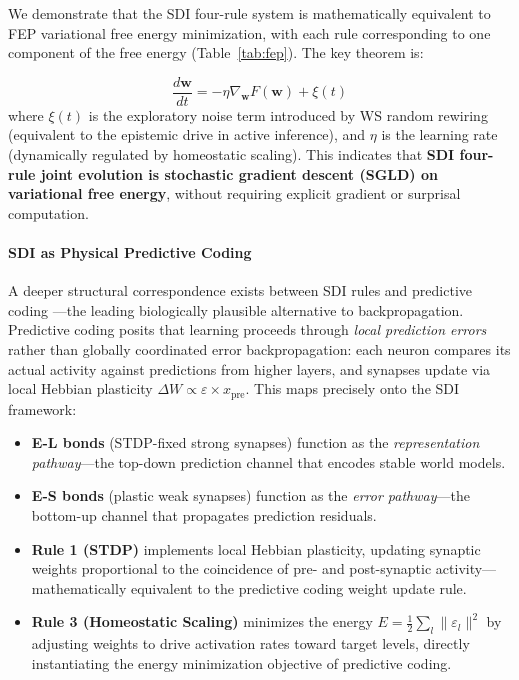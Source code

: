 \documentclass[12pt,a4paper]{article}
\begin{document}
We demonstrate that the SDI four-rule system is mathematically equivalent to FEP variational free energy minimization, with each rule corresponding to one component of the free energy (Table~\ref{tab:fep}). The key theorem is:

\begin{equation}
\frac{d\mathbf{w}}{dt} = -\eta \nabla_{\mathbf{w}} F(\mathbf{w}) + \xi(t)
\label{eq:sgld}
\end{equation}
where $\xi(t)$ is the exploratory noise term introduced by WS random rewiring (equivalent to the epistemic drive in active inference), and $\eta$ is the learning rate (dynamically regulated by homeostatic scaling). This indicates that \textbf{SDI four-rule joint evolution is stochastic gradient descent (SGLD) on variational free energy}, without requiring explicit gradient or surprisal computation.

\paragraph{SDI as Physical Predictive Coding}
A deeper structural correspondence exists between SDI rules and predictive coding \citep{rao1999}---the leading biologically plausible alternative to backpropagation. Predictive coding posits that learning proceeds through \emph{local prediction errors} rather than globally coordinated error backpropagation: each neuron compares its actual activity against predictions from higher layers, and synapses update via local Hebbian plasticity $\Delta W \propto \varepsilon \times x_{\text{pre}}$. This maps precisely onto the SDI framework:

\begin{itemize}
  \item \textbf{E-L bonds} (STDP-fixed strong synapses) function as the \emph{representation pathway}---the top-down prediction channel that encodes stable world models.
  \item \textbf{E-S bonds} (plastic weak synapses) function as the \emph{error pathway}---the bottom-up channel that propagates prediction residuals.
  \item \textbf{Rule 1 (STDP)} implements local Hebbian plasticity, updating synaptic weights proportional to the coincidence of pre- and post-synaptic activity---mathematically equivalent to the predictive coding weight update rule.
  \item \textbf{Rule 3 (Homeostatic Scaling)} minimizes the energy $E = \tfrac{1}{2}\sum_l \|\varepsilon_l\|^2$ by adjusting weights to drive activation rates toward target levels, directly instantiating the energy minimization objective of predictive coding.
\end{itemize}
\end{document}
